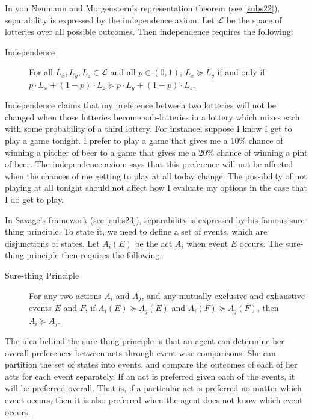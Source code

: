 In von Neumann and Morgenstern's representation theorem (see \autoref{subs22}), separability is expressed by the independence axiom. Let $\mathscr{L}$ be the space of lotteries over all possible outcomes. Then independence requires the following:
\begin{description}
\item[Independence] For all $L_x, L_y, L_z \in \mathscr{L}$ and all $p \in (0, 1)$, $L_x \succcurlyeq L_y$ if and only if $p \cdot L_x + (1 - p) \cdot L_z \succcurlyeq p \cdot L_y + (1 - p) \cdot L_z$.
\end{description}
Independence claims that my preference between two lotteries will not be changed when those lotteries become sub-lotteries in a lottery which mixes each with some probability of a third lottery. For instance, suppose I know I get to play a game tonight. I prefer to play a game that gives me a 10\% chance of winning a pitcher of beer to a game that gives me a 20\% chance of winning a pint of beer. The independence axiom says that this preference will not be affected when the chances of me getting to play at all today change. The possibility of not playing at all tonight should not affect how I evaluate my options in the case that I do get to play.

In Savage's framework (see \autoref{subs23}), separability is expressed by his famous sure-thing principle. To state it, we need to define a set of events, which are disjunctions of states. Let $A_i (E)$ be the act $A_i$ when event $E$ occurs. The sure-thing principle then requires the following.
\begin{description}
\item[Sure-thing Principle] For any two actions $A_i$ and $A_j$, and any mutually exclusive and exhaustive events $E$ and $F$, if $A_i (E) \succcurlyeq A_j (E)$ and $A_i (F) \succcurlyeq A_j (F)$, then $A_i \succcurlyeq A_j$.
\end{description}
The idea behind the sure-thing principle is that an agent can determine her overall preferences between acts through event-wise comparisons. She can partition the set of states into events, and compare the outcomes of each of her acts for each event separately. If an act is preferred given each of the events, it will be preferred overall. That is, if a particular act is preferred no matter which event occurs, then it is also preferred when the agent does not know which event occurs.

